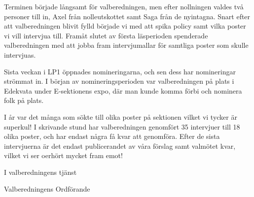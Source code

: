 \documentclass[../_main/handlingar.tex]{subfiles}
\begin{document}
Terminen började långsamt för valberedningen, men efter nollningen valdes två personer till in, Axel från nolleutskottet samt Saga från de nyintagna. Snart efter att valberedningen blivit fylld började vi med att spika policy samt vilka poster vi vill intervjua till. Framåt slutet av första läsperioden spenderade valberedningen med att jobba fram intervjumallar för samtliga poster som skulle intervjuas.


Sista veckan i LP1 öppnades nomineringarna, och sen dess har nomineringar strömmat in. I början av nomineringsperioden var valberedningen på plats i Edekvata under E-sektionens expo, där man kunde komma förbi och nominera folk på plats.

I år var det många som sökte till olika poster på sektionen vilket vi tycker är superkul! I skrivande stund har valberedningen genomfört 35 intervjuer till 18 olika poster, och har endast några få kvar att genomföra. Efter de sista intervjuerna är det endast publicerandet av våra förslag samt valmötet kvar, vilket vi ser oerhört mycket fram emot!

\begin{signatures}{1}
    I valberedningens tjänst
    \signature{Christian Benson}{Valberedningens Ordförande}
\end{signatures}
\end{document}
